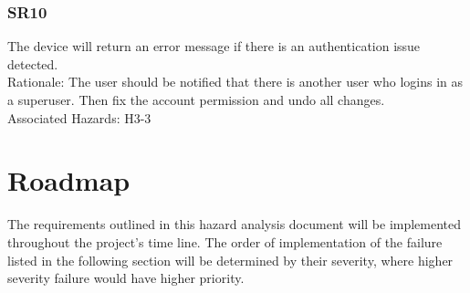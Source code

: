 \documentclass{article}
\begin{document}
\subsubsection{SR10}
The device will return an error message if there is an authentication issue detected. \\
Rationale: The user should be notified that there is another user who logins in as a superuser. Then fix the account permission and undo all changes. \\
Associated Hazards: H3-3
\section{Roadmap}
The requirements outlined in this hazard analysis document will be implemented throughout the project's time line. The order of implementation of the failure listed in the following section will be determined by their severity, where higher severity failure would have higher priority. 
\end{document}
